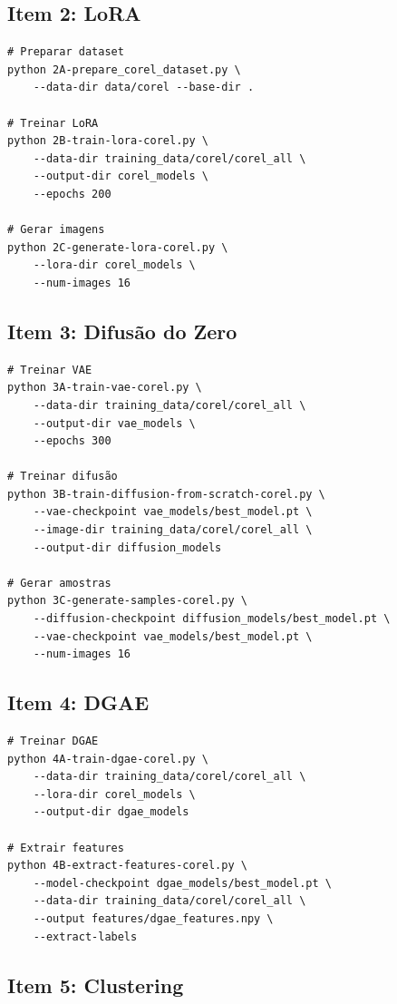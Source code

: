 \subsection{Item 2: LoRA}

\begin{verbatim}
# Preparar dataset
python 2A-prepare_corel_dataset.py \
    --data-dir data/corel --base-dir .

# Treinar LoRA
python 2B-train-lora-corel.py \
    --data-dir training_data/corel/corel_all \
    --output-dir corel_models \
    --epochs 200

# Gerar imagens
python 2C-generate-lora-corel.py \
    --lora-dir corel_models \
    --num-images 16
\end{verbatim}

\subsection{Item 3: Difusão do Zero}

\begin{verbatim}
# Treinar VAE
python 3A-train-vae-corel.py \
    --data-dir training_data/corel/corel_all \
    --output-dir vae_models \
    --epochs 300

# Treinar difusão
python 3B-train-diffusion-from-scratch-corel.py \
    --vae-checkpoint vae_models/best_model.pt \
    --image-dir training_data/corel/corel_all \
    --output-dir diffusion_models

# Gerar amostras
python 3C-generate-samples-corel.py \
    --diffusion-checkpoint diffusion_models/best_model.pt \
    --vae-checkpoint vae_models/best_model.pt \
    --num-images 16
\end{verbatim}

\subsection{Item 4: DGAE}

\begin{verbatim}
# Treinar DGAE
python 4A-train-dgae-corel.py \
    --data-dir training_data/corel/corel_all \
    --lora-dir corel_models \
    --output-dir dgae_models

# Extrair features
python 4B-extract-features-corel.py \
    --model-checkpoint dgae_models/best_model.pt \
    --data-dir training_data/corel/corel_all \
    --output features/dgae_features.npy \
    --extract-labels
\end{verbatim}

\subsection{Item 5: Clustering}

